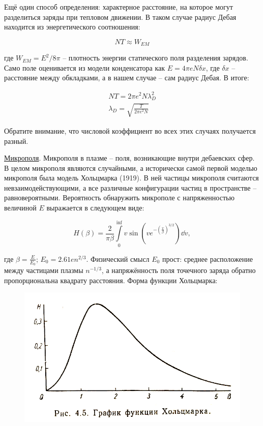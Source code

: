 \documentclass[10pt, a4paper]{article}
\begin{document}
\begin{itemize}
	Ещё один способ определения: характерное расстояние, на которое могут разделиться заряды при тепловом движении. В таком случае радиус Дебая находится из энергетического соотношения:
	
	\begin{equation*}
		NT \approx W_{EM}
	\end{equation*}

	где $W_{EM}=E^2/8\pi$ -- плотность энергии статического поля разделения зарядов. Само поле оценивается из модели конденсатора как $E=4\pi e N \delta x$, где $\delta x$ -- расстояние между обкладками, а в нашем случае -- сам радиус Дебая. В итоге:
	
	\begin{align*}
		NT = 2\pi e^2 N \lambda_D^2 \\
		\lambda_D = \sqrt{\frac{T}{2\pi e^2 N}}		
	\end{align*}

	Обратите внимание, что числовой коэффициент во всех этих случаях получается разный.
\end{itemize}

\uline{Микрополя}.
Микрополя в плазме -- поля, возникающие внутри дебаевских сфер. В целом микрополя являются случайными, а исторически самой первой моделью микрополя была модель Хольцмарка (1919). В ней частицы микрополя считаются невзаимодействующими, а все различные конфигурации частиц в пространстве -- равновероятными. Вероятность обнаружить микрополе с напряженностью величиной $E$ выражается в следующем виде:

\begin{equation*}
	H(\beta) = \frac{2}{\pi \beta} \int\limits_{0}^{\inf} v \sin(v e^{- \left(\frac{v}{\beta}\right)^{3/2}}) \dd{v},
\end{equation*}

где $\beta = \frac{E}{E_0}$; $E_0 = 2.61 e n^{2/3}$. Физический смысл $E_0$ прост: среднее расположение между частицами плазмы ${n^{-1/3}}$, а напряжённость поля точечного заряда обратно пропорциональна квадрату расстояния. Форма функции Хольцмарка:

\begin{figure}[ht]
	\begin{center}
		\includegraphics[width=0.6\linewidth]{Holsmark.JPG}
	\end{center}
\end{figure}
\end{document}
